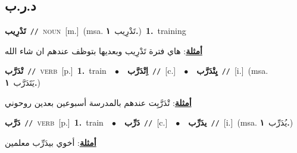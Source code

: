 \documentclass[10pt,a4paper,twoside]{article} %
\begin{document}
\begin{multicols}{2}
\vspace{-3mm}
\subsection*{\color{blue}\foreignlanguage{arabic}{د.ر.ب}\color{blue}{}} 

{\setlength\topsep{0pt}\textbf{\foreignlanguage{arabic}{تَدْرِيب}}\ {\color{gray}\texttt{//}\color{black}}\ \textsc{noun}\ [m.]\ \color{gray}(msa. \foreignlanguage{arabic}{تَدْرِيب}~\foreignlanguage{arabic}{\textbf{١.}})\color{black}\ \textbf{1.}~training\  \begin{flushright}\color{gray}\foreignlanguage{arabic}{\textbf{\underline{\foreignlanguage{arabic}{أمثلة}}}: هاي فترة تَدْرِيب وبعديها بتوظف عندهم ان شاء الله}\end{flushright}\color{black}} \vspace{2mm}

{\setlength\topsep{0pt}\textbf{\foreignlanguage{arabic}{تْدَرَّب}}\ {\color{gray}\texttt{//}\color{black}}\ \textsc{verb}\ [p.]\ \textbf{1.}~train\ \ $\bullet$\ \ \setlength\topsep{0pt}\textbf{\foreignlanguage{arabic}{اِتْدَرَّب}}\ {\color{gray}\texttt{//}\color{black}}\ [c.]\ \ $\bullet$\ \ \setlength\topsep{0pt}\textbf{\foreignlanguage{arabic}{يِتْدَرَّب}}\ {\color{gray}\texttt{//}\color{black}}\ [i.]\ \color{gray}(msa. \foreignlanguage{arabic}{يَتَدَرَّب}~\foreignlanguage{arabic}{\textbf{١.}})\color{black}\  \begin{flushright}\color{gray}\foreignlanguage{arabic}{\textbf{\underline{\foreignlanguage{arabic}{أمثلة}}}: تْدَرَّبِت عندهم بالمدرسة أسبوعين بعدين روحوني}\end{flushright}\color{black}} \vspace{2mm}

{\setlength\topsep{0pt}\textbf{\foreignlanguage{arabic}{دَرَّب}}\ {\color{gray}\texttt{//}\color{black}}\ \textsc{verb}\ [p.]\ \textbf{1.}~train\ \ $\bullet$\ \ \setlength\topsep{0pt}\textbf{\foreignlanguage{arabic}{دَرِّب}}\ {\color{gray}\texttt{//}\color{black}}\ [c.]\ \ $\bullet$\ \ \setlength\topsep{0pt}\textbf{\foreignlanguage{arabic}{يدَرِّب}}\ {\color{gray}\texttt{//}\color{black}}\ [i.]\ \color{gray}(msa. \foreignlanguage{arabic}{يُدَرِّب}~\foreignlanguage{arabic}{\textbf{١.}})\color{black}\  \begin{flushright}\color{gray}\foreignlanguage{arabic}{\textbf{\underline{\foreignlanguage{arabic}{أمثلة}}}: أخوي بيدَرِّب معلمين}\end{flushright}\color{black}} \vspace{2mm}


\end{multicols}
\end{document}
